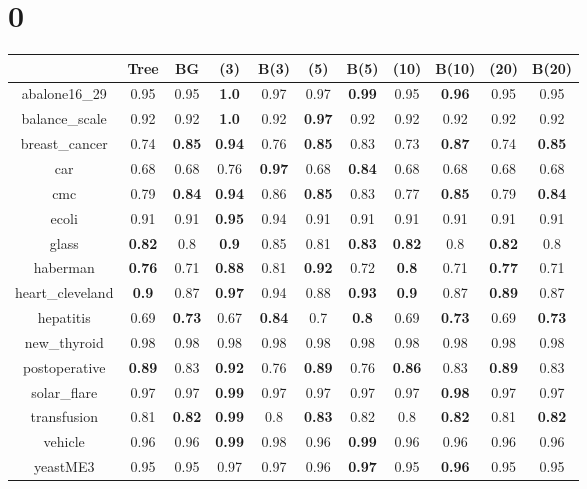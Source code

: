 \documentclass{article}%
\begin{document}
%
\normalsize%
\section*{0}%
\begin{tabular}{c|cccccccccc}%
\hline%
&Tree&BG&(3)&B(3)&(5)&B(5)&(10)&B(10)&(20)&B(20)\\%
\hline%
abalone16\_29&0.95&0.95&\textbf{1.0}&0.97&0.97&\textbf{0.99}&0.95&\textbf{0.96}&0.95&0.95\\%
\hline%
balance\_scale&0.92&0.92&\textbf{1.0}&0.92&\textbf{0.97}&0.92&0.92&0.92&0.92&0.92\\%
\hline%
breast\_cancer&0.74&\textbf{0.85}&\textbf{0.94}&0.76&\textbf{0.85}&0.83&0.73&\textbf{0.87}&0.74&\textbf{0.85}\\%
\hline%
car&0.68&0.68&0.76&\textbf{0.97}&0.68&\textbf{0.84}&0.68&0.68&0.68&0.68\\%
\hline%
cmc&0.79&\textbf{0.84}&\textbf{0.94}&0.86&\textbf{0.85}&0.83&0.77&\textbf{0.85}&0.79&\textbf{0.84}\\%
\hline%
ecoli&0.91&0.91&\textbf{0.95}&0.94&0.91&0.91&0.91&0.91&0.91&0.91\\%
\hline%
glass&\textbf{0.82}&0.8&\textbf{0.9}&0.85&0.81&\textbf{0.83}&\textbf{0.82}&0.8&\textbf{0.82}&0.8\\%
\hline%
haberman&\textbf{0.76}&0.71&\textbf{0.88}&0.81&\textbf{0.92}&0.72&\textbf{0.8}&0.71&\textbf{0.77}&0.71\\%
\hline%
heart\_cleveland&\textbf{0.9}&0.87&\textbf{0.97}&0.94&0.88&\textbf{0.93}&\textbf{0.9}&0.87&\textbf{0.89}&0.87\\%
\hline%
hepatitis&0.69&\textbf{0.73}&0.67&\textbf{0.84}&0.7&\textbf{0.8}&0.69&\textbf{0.73}&0.69&\textbf{0.73}\\%
\hline%
new\_thyroid&0.98&0.98&0.98&0.98&0.98&0.98&0.98&0.98&0.98&0.98\\%
\hline%
postoperative&\textbf{0.89}&0.83&\textbf{0.92}&0.76&\textbf{0.89}&0.76&\textbf{0.86}&0.83&\textbf{0.89}&0.83\\%
\hline%
solar\_flare&0.97&0.97&\textbf{0.99}&0.97&0.97&0.97&0.97&\textbf{0.98}&0.97&0.97\\%
\hline%
transfusion&0.81&\textbf{0.82}&\textbf{0.99}&0.8&\textbf{0.83}&0.82&0.8&\textbf{0.82}&0.81&\textbf{0.82}\\%
\hline%
vehicle&0.96&0.96&\textbf{0.99}&0.98&0.96&\textbf{0.99}&0.96&0.96&0.96&0.96\\%
\hline%
yeastME3&0.95&0.95&0.97&0.97&0.96&\textbf{0.97}&0.95&\textbf{0.96}&0.95&0.95\\%

\end{tabular}
\end{document}
